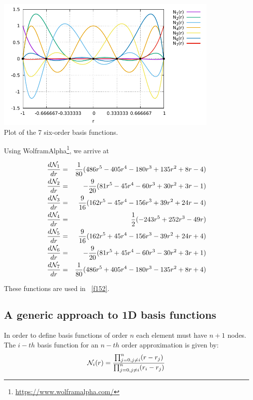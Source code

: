 \begin{center}
\includegraphics[width=11cm]{images/basis1D/Q6.pdf}\\
{\captionfont Plot of the 7 six-order basis functions.}
\end{center}

Using WolframAlpha\footnote{\url{https://www.wolframalpha.com/}}, we arrive at 

\begin{eqnarray}
\frac{d {\mathcal{N}}_1}{dr} &=& \frac{1}{80} (486r^5 - 405r^4 - 180r^3 + 135 r^2 +8r-4) \nonumber\\
\frac{d {\mathcal{N}}_2}{dr} &=& -\frac{9}{20} (81r^5 - 45r^4 -60r^3 + 30r^2 +3r -1) \nonumber\\ 
\frac{d {\mathcal{N}}_3}{dr} &=& \frac{9}{16} (162r^5-45r^4 -156r^3 +39r^2 +24r -4) \nonumber\\ 
\frac{d {\mathcal{N}}_4}{dr} &=& \frac{1}{2} (-243r^5+252r^3-49r) \nonumber\\
\frac{d {\mathcal{N}}_5}{dr} &=& \frac{9}{16} (162r^5 +45r^4 -156r^3 -39r^2 +24r +4) \nonumber\\ 
\frac{d {\mathcal{N}}_6}{dr} &=& -\frac{9}{20} (81r^5 +45r^4 -60r^3 - 30r^2 +3r +1) \nonumber\\ 
\frac{d {\mathcal{N}}_7}{dr} &=& \frac{1}{80} (486r^5 + 405r^4 - 180r^3 -135r^2 +8r+4) 
\end{eqnarray}

These functions are used in \stone~\ref{f152}.





\subsection{A generic approach to 1D basis functions \label{sec:bfgeneric}}

In order to define basis functions of order $n$ each element 
must have $n+1$ nodes.
The $i-th$ basis function for an $n-th$ order approximation
is given by:
\[
{\mathcal{N}}_i(r) = 
\frac{
\prod_{j=0,j \ne i}^n (r-r_j)
}
{
\prod_{j=0,j \ne i}^n (r_i-r_j)
}
\]

